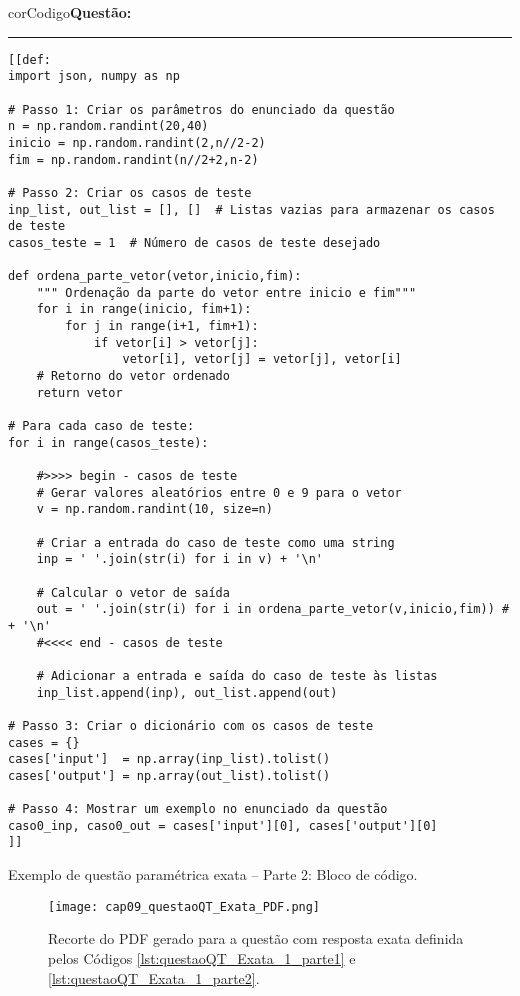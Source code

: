\begin{listing}[!h]
\begin{myboxCode}{corCodigo}{\textbf{Questão: }}\vspace{3mm}
\hrule
\begin{verbatim}
[[def: 
import json, numpy as np

# Passo 1: Criar os parâmetros do enunciado da questão
n = np.random.randint(20,40)
inicio = np.random.randint(2,n//2-2)
fim = np.random.randint(n//2+2,n-2)
    
# Passo 2: Criar os casos de teste
inp_list, out_list = [], []  # Listas vazias para armazenar os casos de teste
casos_teste = 1  # Número de casos de teste desejado

def ordena_parte_vetor(vetor,inicio,fim):        
    """ Ordenação da parte do vetor entre inicio e fim"""
    for i in range(inicio, fim+1):
        for j in range(i+1, fim+1):
            if vetor[i] > vetor[j]:
                vetor[i], vetor[j] = vetor[j], vetor[i]
    # Retorno do vetor ordenado
    return vetor
    
# Para cada caso de teste:
for i in range(casos_teste):    

    #>>>> begin - casos de teste
    # Gerar valores aleatórios entre 0 e 9 para o vetor 
    v = np.random.randint(10, size=n) 

    # Criar a entrada do caso de teste como uma string
    inp = ' '.join(str(i) for i in v) + '\n'

    # Calcular o vetor de saída
    out = ' '.join(str(i) for i in ordena_parte_vetor(v,inicio,fim)) # + '\n'
    #<<<< end - casos de teste

    # Adicionar a entrada e saída do caso de teste às listas
    inp_list.append(inp), out_list.append(out)

# Passo 3: Criar o dicionário com os casos de teste
cases = {}
cases['input']  = np.array(inp_list).tolist()
cases['output'] = np.array(out_list).tolist()

# Passo 4: Mostrar um exemplo no enunciado da questão
caso0_inp, caso0_out = cases['input'][0], cases['output'][0]
]]
\end{verbatim}
\end{myboxCode}
\caption{Exemplo de questão paramétrica exata -- Parte 2: Bloco de código.}
\label{lst:questaoQT_Exata_1_parte2}
\end{listing}

\begin{figure}[!ht]
  \texttt{[image: cap09\_questaoQT\_Exata\_PDF.png]}
  \caption{Recorte do PDF gerado para a questão com resposta exata definida pelos Códigos \ref{lst:questaoQT_Exata_1_parte1} e \ref{lst:questaoQT_Exata_1_parte2}.}
  \label{fig:cap09_questaoQT_Exata_PDF}
\end{figure}

